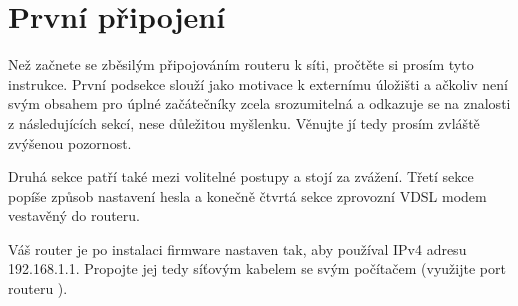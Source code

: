 \section{První připojení}
Než začnete se zběsilým připojováním routeru k síti, pročtěte si prosím tyto
instrukce. První podsekce slouží jako motivace k externímu úložišti a ačkoliv
není svým obsahem pro úplné začátečníky zcela srozumitelná a odkazuje se na
znalosti z následujících sekcí, nese důležitou
myšlenku. Věnujte jí tedy prosím zvláště zvýšenou pozornost.

Druhá sekce patří také mezi volitelné postupy a stojí za zvážení. Třetí sekce
popíše způsob nastavení hesla a konečně čtvrtá sekce zprovozní VDSL modem
vestavěný do routeru.

Váš router je po instalaci firmware nastaven tak, aby používal IPv4 adresu
192.168.1.1. Propojte jej tedy síťovým kabelem se svým počítačem (využijte
port routeru ).







